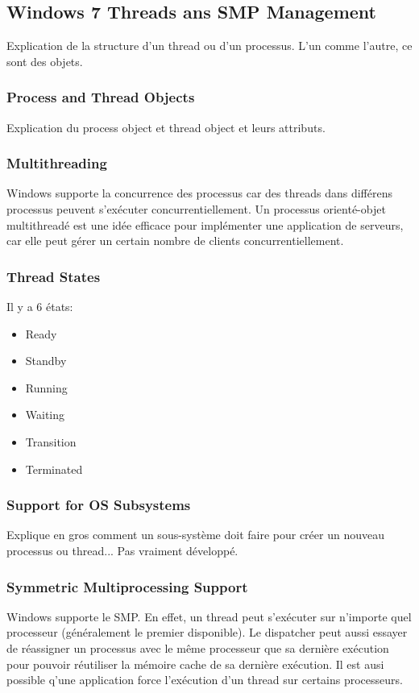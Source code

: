 \subsection{Windows 7 Threads ans SMP Management}
Explication de la structure d'un thread ou d'un processus.
L'un comme l'autre, ce sont des objets.

\subsubsection{Process and Thread Objects}
Explication du process object et thread object et leurs attributs.

\subsubsection{Multithreading}
Windows supporte la concurrence des processus car des threads dans différens processus peuvent s'exécuter concurrentiellement.
Un processus orienté-objet multithreadé est une idée efficace pour implémenter une application de serveurs, car elle peut gérer un certain nombre de clients concurrentiellement.

\subsubsection{Thread States}
Il y a 6 états:
\begin{itemize}
  \item Ready
  \item Standby
  \item Running
  \item Waiting
  \item Transition
  \item Terminated
\end{itemize}

\subsubsection{Support for OS Subsystems}
Explique en gros comment un sous-système doit faire pour créer un nouveau processus ou thread...
Pas vraiment développé.
\subsubsection{Symmetric Multiprocessing Support}
Windows supporte le SMP.
En effet, un thread peut s'exécuter sur n'importe quel processeur (généralement le premier disponible).
Le dispatcher peut aussi essayer de réassigner un processus avec le même processeur que sa dernière exécution pour pouvoir réutiliser la mémoire cache de sa dernière exécution.
Il est ausi possible q'une application force l'exécution d'un thread sur certains processeurs.
